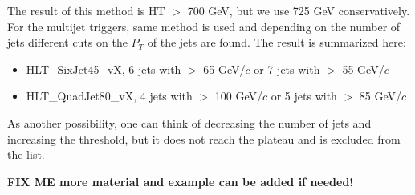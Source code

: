 The result of this method is HT $>$ 700 GeV, but we use 725 GeV conservatively. For the multijet triggers, same method is used and 
depending on the number of jets different cuts on the  $P_T$ of the jets are found. The result is summarized here:
\begin{itemize}
\item HLT\_SixJet45\_vX, 6 jets with \pT $>$ 65 GeV/$c$ or 7 jets with \pT $>$ 55 GeV/$c$
\item HLT\_QuadJet80\_vX, 4 jets with \pT $>$ 100 GeV/$c$ or 5 jets with \pT $>$ 85 GeV/$c$
\end{itemize}
As another possibility, one can think of decreasing the number of jets and increasing the \pT threshold, but it does not reach the
plateau and is excluded from the list.

{\bf FIX ME more material and example can be added if needed!}

